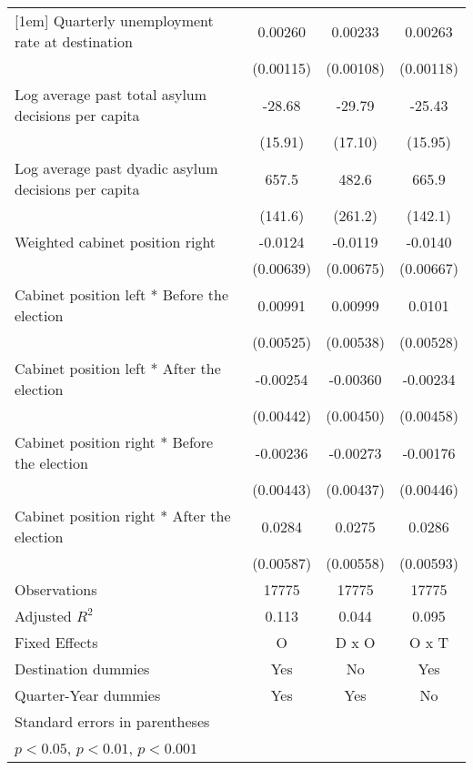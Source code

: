 \begin{table}[htbp]
\begin{tabular}{l*{3}{c}}
[1em]
Quarterly unemployment rate at destination&     0.00260\sym{*}  &     0.00233\sym{*}  &     0.00263\sym{*}  \\
                    &   (0.00115)         &   (0.00108)         &   (0.00118)         \\
[1em]
Log average past total asylum decisions per capita&      -28.68         &      -29.79         &      -25.43         \\
                    &     (15.91)         &     (17.10)         &     (15.95)         \\
[1em]
Log average past dyadic asylum decisions per capita&       657.5\sym{***}&       482.6         &       665.9\sym{***}\\
                    &     (141.6)         &     (261.2)         &     (142.1)         \\
[1em]
Weighted cabinet position right&     -0.0124         &     -0.0119         &     -0.0140\sym{*}  \\
                    &   (0.00639)         &   (0.00675)         &   (0.00667)         \\
[1em]
Cabinet position left * Before the election&     0.00991         &     0.00999         &      0.0101         \\
                    &   (0.00525)         &   (0.00538)         &   (0.00528)         \\
[1em]
Cabinet position left * After the election&    -0.00254         &    -0.00360         &    -0.00234         \\
                    &   (0.00442)         &   (0.00450)         &   (0.00458)         \\
[1em]
Cabinet position right * Before the election&    -0.00236         &    -0.00273         &    -0.00176         \\
                    &   (0.00443)         &   (0.00437)         &   (0.00446)         \\
[1em]
Cabinet position right * After the election&      0.0284\sym{***}&      0.0275\sym{***}&      0.0286\sym{***}\\
                    &   (0.00587)         &   (0.00558)         &   (0.00593)         \\
\hline
Observations        &       17775         &       17775         &       17775         \\
Adjusted \(R^{2}\)  &       0.113         &       0.044         &       0.095         \\
Fixed Effects       &           O         &       D x O         &       O x T         \\
Destination dummies &         Yes         &          No         &         Yes         \\
Quarter-Year dummies&         Yes         &         Yes         &          No         \\
\hline\hline
\multicolumn{4}{l}{\footnotesize Standard errors in parentheses}\\
\multicolumn{4}{l}{\footnotesize \sym{*} \(p<0.05\), \sym{**} \(p<0.01\), \sym{***} \(p<0.001\)}\\
\end{tabular}
\end{table}
